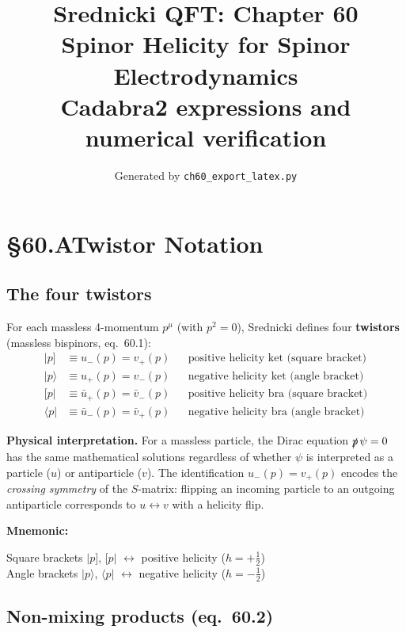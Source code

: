 \documentclass[12pt]{article}
\title{\textbf{Srednicki QFT: Chapter 60}\\[6pt]
       \large Spinor Helicity for Spinor Electrodynamics\\[4pt]
       \normalsize Cadabra2 expressions and numerical verification}
\author{Generated by \texttt{ch60\_export\_latex.py}}
\date{}
\begin{document}
\maketitle
\tableofcontents
\newpage

\section{§60.A\quad Twistor Notation}

\subsection{The four twistors}

For each massless 4-momentum $p^\mu$ (with $p^2=0$), Srednicki defines
four \textbf{twistors} (massless bispinors, eq.~60.1):
\begin{align}
  |p] &\equiv u_-(p) = v_+(p)
  &&\text{positive helicity ket (square bracket)}
  \tag{60.1a}\\
  |p\rangle &\equiv u_+(p) = v_-(p)
  &&\text{negative helicity ket (angle bracket)}
  \tag{60.1b}\\
  [p| &\equiv \bar u_+(p) = \bar v_-(p)
  &&\text{positive helicity bra (square bracket)}
  \tag{60.1c}\\
  \langle p| &\equiv \bar u_-(p) = \bar v_+(p)
  &&\text{negative helicity bra (angle bracket)}
  \tag{60.1d}
\end{align}

\textbf{Physical interpretation.}
For a massless particle, the Dirac equation $\slashed{p}\,\psi=0$ has the same
mathematical solutions regardless of whether $\psi$ is interpreted as a particle
($u$) or antiparticle ($v$).  The identification $u_-(p)=v_+(p)$ encodes the
\emph{crossing symmetry} of the $S$-matrix: flipping an incoming particle to
an outgoing antiparticle corresponds to $u\leftrightarrow v$ with a helicity
flip.

\textbf{Mnemonic:}
\begin{center}
  Square brackets $|p]$, $[p|$ $\leftrightarrow$ positive helicity ($h=+\tfrac12$)\\[2pt]
  Angle brackets  $|p\rangle$, $\langle p|$ $\leftrightarrow$ negative helicity ($h=-\tfrac12$)
\end{center}

\subsection{Non-mixing products (eq.~60.2)}
\end{document}
